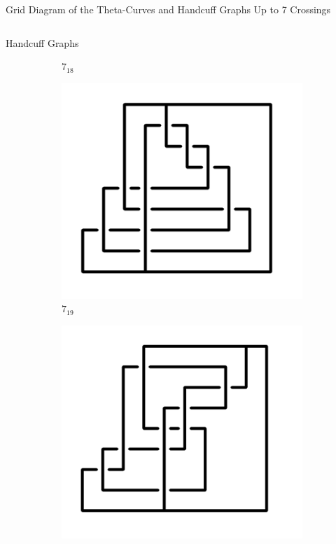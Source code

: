 \documentclass[final]{beamer}
\begin{document}
\begin{frame}[t]
\begin{alertblock}{Grid Diagram of the Theta-Curves and Handcuff Graphs Up to 7 Crossings}
\begin{columns}[t]
\begin{column}{0.5\textwidth}
\begin{alertblock}{Handcuff Graphs}
\begin{figure}
\begin{subfigure}{0.075\textwidth}
    \caption{$7_{18}$} 
    \end{subfigure}
    \begin{subfigure}{0.075\textwidth}
    \includegraphics[width=\columnwidth]{../Midterm_Poster/grid_diagram/handcuff_7_19.png}
    \caption{$7_{19}$} 
    \end{subfigure}
    \begin{subfigure}{0.075\textwidth}
    \includegraphics[width=\columnwidth]{../Midterm_Poster/grid_diagram/handcuff_7_20.png}

\end{subfigure}
\end{figure}
\end{alertblock}
\end{column}
\end{columns}
\end{alertblock}
\end{frame}
\end{document}
